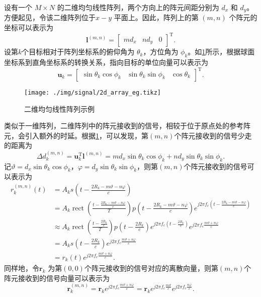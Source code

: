 设有一个 \(M \times N\) 的二维均匀线性阵列，两个方向上的阵元间距分别为 \(d_x\) 和 \(d_y\)。方便起见，令该二维阵列位于\( x-y \) 平面上。因此，阵列上的第 \( (m,n) \) 个阵元的坐标可以表示为
\[
    \bm{l}^{(m, n)} = \begin{bmatrix}
        m d_x & n d_y & 0
    \end{bmatrix}^{\mathrm{T}}.
\]
设第\( k \)个目标相对于阵列坐标系的俯仰角为 \(\theta_k\)，方位角为 \(\phi_k\)。如\cref{fig_2d_array_eg}所示，根据球面坐标系到直角坐标系的转换关系，指向目标的单位向量可以表示为
\[
    \bm{u}_k = \begin{bmatrix}
        \sin\theta_k \cos\phi_k & \sin\theta_k \sin\phi_k & \cos\theta_k
    \end{bmatrix}^{\mathrm{T}}.
\]

\begin{figure}[htb!]
    \centering
    \texttt{[image: ./img/signal/2d\_array\_eg.tikz]}
    \caption{二维均匀线性阵列示例}
    \label{fig_2d_array_eg}
\end{figure}

类似于一维阵列，二维阵列中的阵元接收到的信号，相较于位于原点处的参考阵元，会引入额外的时延。根据\cref{fig_2d_array_eg}，可以发现，第\( (m,n) \)个阵元接收到的信号少走的距离为
\[
    \Delta d^{(m,n)}_k = \bm{u}_k^{\mathrm{T}} \bm{l}^{(m,n)} = m d_x \sin\theta_k \cos\phi_k + n d_y \sin\theta_k \sin\phi_k.
\]
记\( \vartheta = d_x \sin\theta_k \cos\phi_k \)，\( \varphi = d_y \sin\theta_k \sin\phi_k \)，则第\( (m,n) \)个阵元接收到的信号可以表示为
\[
    \begin{split}
        r^{(m,n)}_k(t) & = A_k s\left(t - \frac{2 R_k - m \vartheta - n \varphi}{c}\right)                                                                                                                                                                    \\
                       & = A_k \operatorname{rect}\left(\frac{t - \frac{2 R_k - m \vartheta - n \varphi}{c}}{T}\right) p\left(t - \frac{2 R_k - m \vartheta - n \varphi}{c}\right) e^{j 2 \pi f_c \left(t - \frac{2 R_k - m \vartheta - n \varphi}{c}\right)} \\
                       & \approx A_k \operatorname{rect}\left(\frac{t - \frac{2 R_k}{c}}{T}\right) p\left(t - \frac{2 R_k}{c}\right) e^{j 2 \pi f_c \left(t - \frac{2 R_k}{c}\right)} e^{j 2 \pi f_c \frac{m \vartheta + n \varphi}{c}}                       \\
                       & = A_k s\left(t - \frac{2 R_k}{c}\right) e^{j 2 \pi f_c \frac{m \vartheta + n \varphi}{c}}                                                                                                                                            \\
                       & = r_k(t) e^{j 2 \pi f_c \frac{m \vartheta + n \varphi}{c}}.
    \end{split}
\]
同样地，令\( \bm{r}_k \) 为第\( (0,0) \)个阵元接收到的信号对应的离散向量，则第\( (m,n) \)个阵元接收到的信号向量可以表示为
\[
    \bm{r}_k^{(m,n)} = \bm{r}_k e^{j 2 \pi f_c \frac{m \vartheta + n \varphi}{c}} = \bm{r}_k e^{j 2 \pi f_c \frac{m \vartheta}{c}} e^{j 2 \pi f_c \frac{n \varphi}{c}}.
\]

